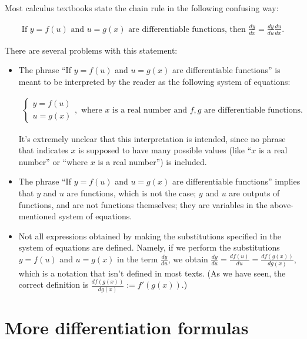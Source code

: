 Most calculus textbooks state the chain rule in the following confusing way:

\begin{align*}
    \text{If $y = f(u)$ and $u = g(x)$ are differentiable functions, then } \frac{dy}{dx} = \frac{dy}{du} \frac{du}{dx}.
\end{align*}

There are several problems with this statement: 

\begin{itemize}
    \item The phrase ``If $y = f(u)$ and $u = g(x)$ are differentiable functions'' is meant to be interpreted by the reader as the following system of equations:

    \begin{align*}
        \begin{cases}
           y = f(u) \\
           u = g(x)
        \end{cases},
        \text{ where $x$ is a real number and $f, g$ are differentiable functions}.
    \end{align*}

    It's extremely unclear that this interpretation is intended, since no phrase that indicates $x$ is supposed to have many possible values (like ``$x$ is a real number'' or ``where $x$ is a real number'') is included.
    
    \item The phrase ``If $y = f(u)$ and $u = g(x)$ are differentiable functions'' implies that $y$ and $u$ are functions, which is not the case; $y$ and $u$ are outputs of functions, and are not functions themselves; they are variables in the above-mentioned system of equations.

    \item Not all expressions obtained by making the substitutions specified in the system of equations are defined. Namely, if we perform the substitutions $y = f(u)$ and $u = g(x)$ in the term $\frac{dy}{du}$, we obtain $\frac{dy}{du} = \frac{df(u)}{du} = \frac{df(g(x))}{dg(x)}$, which is a notation that isn't defined in most texts. (As we have seen, the correct definition is $\frac{df(g(x))}{dg(x)} := f'(g(x))$.)  
\end{itemize}

\section*{More differentiation formulas}

